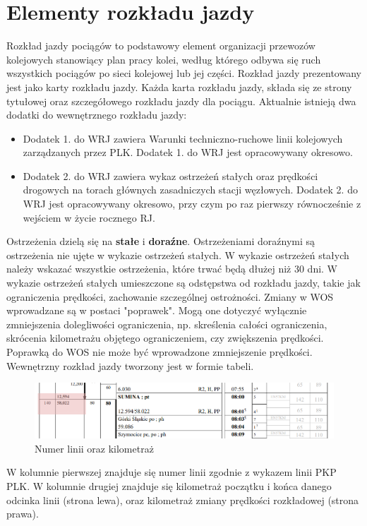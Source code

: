 \section{Elementy rozkładu jazdy}
Rozkład jazdy pociągów to podstawowy element organizacji przewozów kolejowych stanowiący plan pracy kolei, według którego odbywa się ruch wszystkich pociągów po sieci kolejowej lub jej części.  Rozkład jazdy prezentowany jest jako karty rozkładu jazdy. Każda karta rozkładu jazdy, składa się ze strony tytułowej oraz szczegółowego rozkładu jazdy dla pociągu. Aktualnie istnieją dwa dodatki do wewnętrznego rozkładu jazdy:
\begin{tcolorbox}[colback=green!5!white,colframe=green!75!black,width=16cm,title=Dodatki do rozkładu jazdy]
\begin{itemize}
	\item Dodatek 1. do WRJ zawiera Warunki techniczno-ruchowe linii kolejowych zarządzanych przez PLK. Dodatek 1. do WRJ jest
	opracowywany okresowo.
	\item Dodatek 2. do WRJ zawiera wykaz ostrzeżeń stałych oraz prędkości drogowych na torach głównych zasadniczych stacji
	węzłowych. Dodatek 2. do WRJ jest opracowywany okresowo, przy czym po raz pierwszy równocześnie z wejściem w życie rocznego RJ.
\end{itemize}
\end{tcolorbox}
Ostrzeżenia dzielą się na \textbf{stałe} i \textbf{doraźne}. Ostrzeżeniami doraźnymi są ostrzeżenia nie ujęte w wykazie ostrzeżeń stałych. W wykazie ostrzeżeń stałych należy wskazać wszystkie ostrzeżenia, które trwać będą dłużej niż 30 dni.
W wykazie ostrzeżeń stałych umieszczone są odstępstwa od rozkładu jazdy, takie jak ograniczenia prędkości, zachowanie szczególnej ostrożności. Zmiany w WOS wprowadzane są w postaci "poprawek". Mogą one dotyczyć wyłącznie zmniejszenia dolegliwości ograniczenia, np. skreślenia całości ograniczenia, skrócenia kilometrażu objętego ograniczeniem, czy zwiększenia prędkości. Poprawką do WOS nie może być wprowadzone zmniejszenie prędkości. 
Wewnętrzny rozkład jazdy tworzony jest w formie tabeli. \begin{figure}
	\includegraphics[width=12cm]{skryptkierownik-img/numer-linii.png}
	\caption{Numer linii oraz kilometraż}
\end{figure} W kolumnie pierwszej znajduje się numer linii zgodnie z wykazem linii PKP PLK. W kolumnie drugiej znajduje się kilometraż początku i końca danego odcinka linii (strona lewa), oraz kilometraż zmiany prędkości rozkładowej (strona prawa). 

